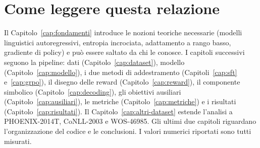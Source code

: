 \section{Come leggere questa relazione}

Il Capitolo~\ref{cap:fondamenti} introduce le nozioni teoriche necessarie
(modelli linguistici autoregressivi, entropia incrociata, adattamento a rango
basso, gradiente di policy) e può essere saltato da chi le conosce. I capitoli
successivi seguono la pipeline: dati (Capitolo~\ref{cap:dataset}), modello
(Capitolo~\ref{cap:modello}), i due metodi di addestramento
(Capitoli~\ref{cap:sft} e~\ref{cap:grpo}), il disegno delle reward
(Capitolo~\ref{cap:reward}), il componente simbolico
(Capitolo~\ref{cap:decoding}), gli obiettivi ausiliari
(Capitolo~\ref{cap:ausiliari}), le metriche (Capitolo~\ref{cap:metriche}) e i
risultati (Capitolo~\ref{cap:risultati}). Il
Capitolo~\ref{cap:altri-dataset} estende l'analisi a PHOENIX-2014T, CoNLL-2003
e WOS-46985. Gli ultimi due capitoli riguardano l'organizzazione del codice e
le conclusioni.
I valori numerici riportati sono tutti misurati.
